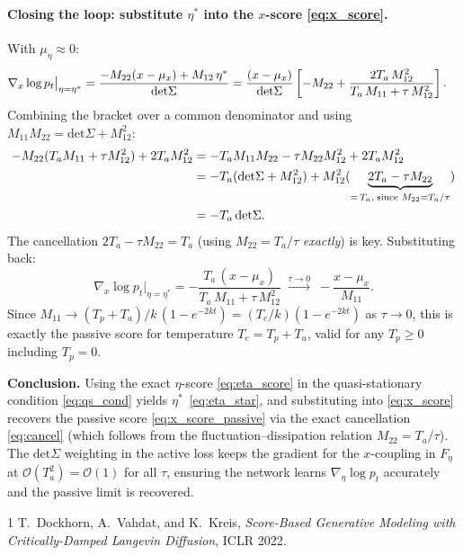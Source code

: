 \documentclass[11pt]{article}
\newcommand{\Tp}{T_p}
\newcommand{\Ta}{T_a}
\newcommand{\Te}{T_e}
\newcommand{\kk}{k}
\newcommand{\tauu}{\tau}
\renewcommand{\det}{\mathrm{det}}
\begin{document}
\paragraph{Closing the loop: substitute $\eta^*$ into the $x$-score \eqref{eq:x_score}.}
With $\mu_\eta\approx 0$:
\begin{align}
\nabla_x\log p_t\big|_{\eta=\eta^*}
&= \frac{-M_{22}(x-\mu_x) + M_{12}\,\eta^*}{\det\Sigma}
= \frac{(x-\mu_x)}{\det\Sigma}
\left[-M_{22} + \frac{2\Ta\,M_{12}^2}{\Ta\,M_{11}+\tauu\,M_{12}^2}\right].
\notag
\end{align}
Combining the bracket over a common denominator and using $M_{11}M_{22}=\det\Sigma+M_{12}^2$:
\begin{align}
-M_{22}(\Ta M_{11}+\tauu M_{12}^2)+2\Ta M_{12}^2
&= -\Ta M_{11}M_{22} - \tauu M_{22}M_{12}^2 + 2\Ta M_{12}^2
\notag\\
&= -\Ta(\det\Sigma+M_{12}^2) + M_{12}^2(\underbrace{2\Ta - \tauu M_{22}}_{=\,\Ta,\;\text{since } M_{22}=\Ta/\tauu})
\notag\\
&= -\Ta\,\det\Sigma.
\label{eq:cancel}
\end{align}
The cancellation $2\Ta - \tauu M_{22} = \Ta$ (using $M_{22}=\Ta/\tauu$ \emph{exactly}) is key.
Substituting back:
\begin{equation}
\nabla_x\log p_t\big|_{\eta=\eta^*}
= -\frac{\Ta\,(x-\mu_x)}{\Ta\,M_{11} + \tauu\,M_{12}^2}
\;\xrightarrow{\tauu\to 0}\; -\frac{x-\mu_x}{M_{11}}.
\label{eq:x_score_passive}
\end{equation}
Since $M_{11}\to(\Tp+\Ta)/\kk\,(1-e^{-2\kk t})=(\Te/\kk)(1-e^{-2\kk t})$ as $\tauu\to 0$,
this is exactly the passive score for temperature $\Te=\Tp+\Ta$, valid for any $\Tp\geq 0$
including $\Tp=0$.

\medskip
\noindent\textbf{Conclusion.}
Using the exact $\eta$-score \eqref{eq:eta_score} in the quasi-stationary condition
\eqref{eq:qs_cond} yields $\eta^*$~\eqref{eq:eta_star}, and substituting into
\eqref{eq:x_score} recovers the passive score \eqref{eq:x_score_passive} via the
exact cancellation \eqref{eq:cancel} (which follows from the fluctuation--dissipation
relation $M_{22}=\Ta/\tauu$).  The $\det\Sigma$ weighting in the active loss keeps
the gradient for the $x$-coupling in $F_\eta$ at $\mathcal{O}(\Ta^2)=\mathcal{O}(1)$
for all $\tauu$, ensuring the network learns $\nabla_\eta\log p_t$ accurately and
the passive limit is recovered.

\begin{thebibliography}{1}
T.~Dockhorn, A.~Vahdat, and K.~Kreis,
\textit{Score-Based Generative Modeling with Critically-Damped Langevin Diffusion},
ICLR 2022.
\end{thebibliography}
\end{document}
